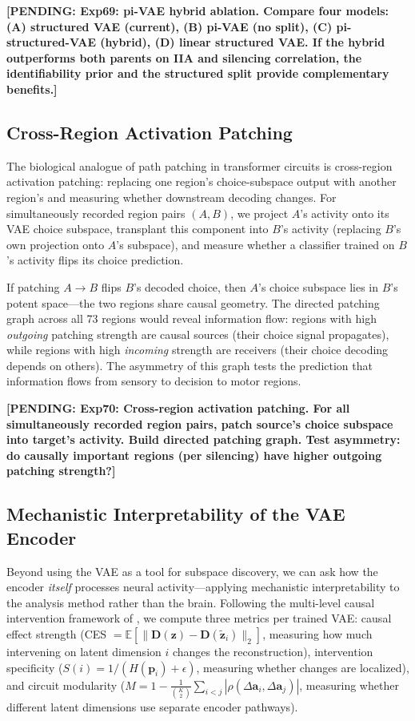 \documentclass{article}
\newcommand{\pending}[1]{\textcolor{red!70!black}{\textbf{[PENDING: #1]}}}
\begin{document}
\pending{Exp69: pi-VAE hybrid ablation. Compare four models: (A) structured VAE (current), (B) pi-VAE (no split), (C) pi-structured-VAE (hybrid), (D) linear structured VAE. If the hybrid outperforms both parents on IIA and silencing correlation, the identifiability prior and the structured split provide complementary benefits.}

\subsection{Cross-Region Activation Patching}

The biological analogue of path patching in transformer circuits \citep{geiger2024finding} is cross-region activation patching: replacing one region's choice-subspace output with another region's and measuring whether downstream decoding changes. For simultaneously recorded region pairs $(A, B)$, we project $A$'s activity onto its VAE choice subspace, transplant this component into $B$'s activity (replacing $B$'s own projection onto $A$'s subspace), and measure whether a classifier trained on $B$'s activity flips its choice prediction.

If patching $A \to B$ flips $B$'s decoded choice, then $A$'s choice subspace lies in $B$'s potent space---the two regions share causal geometry. The directed patching graph across all 73 regions would reveal information flow: regions with high \emph{outgoing} patching strength are causal sources (their choice signal propagates), while regions with high \emph{incoming} strength are receivers (their choice decoding depends on others). The asymmetry of this graph tests the prediction that information flows from sensory to decision to motor regions.

\pending{Exp70: Cross-region activation patching. For all simultaneously recorded region pairs, patch source's choice subspace into target's activity. Build directed patching graph. Test asymmetry: do causally important regions (per silencing) have higher outgoing patching strength?}

\subsection{Mechanistic Interpretability of the VAE Encoder}

Beyond using the VAE as a tool for subspace discovery, we can ask how the encoder \emph{itself} processes neural activity---applying mechanistic interpretability to the analysis method rather than the brain. Following the multi-level causal intervention framework of \citet{martinez2025vae_circuits}, we compute three metrics per trained VAE: causal effect strength (CES $= \mathbb{E}[\|\mathbf{D}(\mathbf{z}) - \mathbf{D}(\tilde{\mathbf{z}}_i)\|_2]$, measuring how much intervening on latent dimension $i$ changes the reconstruction), intervention specificity ($S(i) = 1/(H(\mathbf{p}_i) + \epsilon)$, measuring whether changes are localized), and circuit modularity ($M = 1 - \frac{1}{\binom{K}{2}}\sum_{i<j}|\rho(\Delta \mathbf{a}_i, \Delta \mathbf{a}_j)|$, measuring whether different latent dimensions use separate encoder pathways).
\end{document}
